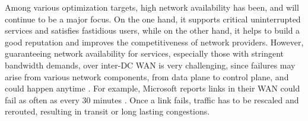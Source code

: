 \documentclass[sigconf]{acmart}
\begin{document}

Among various optimization targets, high network availability has been, and will continue to be a major focus. On the one hand, it supports critical uninterrupted services and satisfies fastidious users, while on the other hand, it helps to build a good reputation and improves the competitiveness of network providers. However, guaranteeing network availability for services, especially those with stringent bandwidth demands, over inter-DC WAN is very challenging, 
since failures may arise from various network components, from data plane to control plane, and could happen anytime \cite{evole,california,understanding}.
For example, Microsoft reports links in their WAN could fail as often as every 30 minutes \cite{FFC}.
Once a link fails, traffic has to be rescaled and rerouted, resulting in transit or long lasting congestions. 
\end{document}
